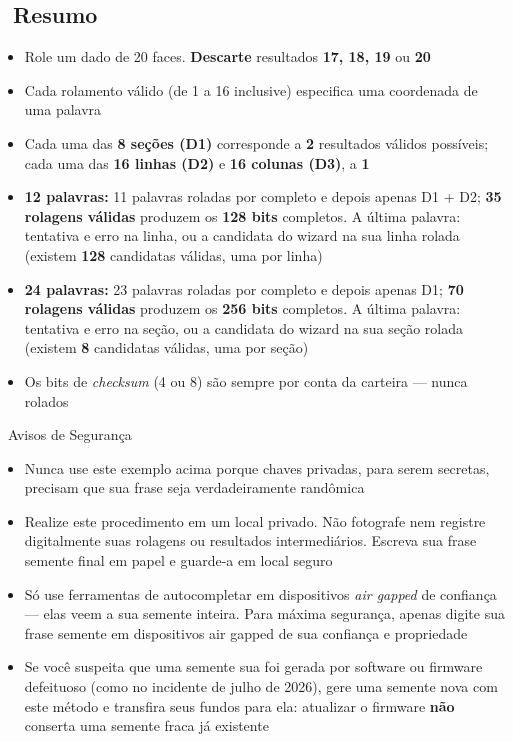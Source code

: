 \documentclass[10pt]{article}
\begin{document}
\subsection*{\faListOl~Resumo}

\begin{itemize}[itemsep=1pt]
 \item Role um dado de 20 faces. \textbf{Descarte} resultados \textbf{17, 18, 19} ou \textbf{20}
 \item Cada rolamento válido (de 1 a 16 inclusive) especifica uma coordenada de uma palavra
 \item Cada uma das \textbf{8 seções (D1)} corresponde a \textbf{2} resultados válidos possíveis; cada uma das \textbf{16 linhas (D2)} e \textbf{16 colunas (D3)}, a \textbf{1}
 \item \textbf{12 palavras:} 11 palavras roladas por completo e depois apenas D1 + D2; \textbf{35 rolagens válidas} produzem os \textbf{128 bits} completos. A última palavra: tentativa e erro na linha, ou a candidata do wizard na sua linha rolada (existem \textbf{128} candidatas válidas, uma por linha)
 \item \textbf{24 palavras:} 23 palavras roladas por completo e depois apenas D1; \textbf{70 rolagens válidas} produzem os \textbf{256 bits} completos. A última palavra: tentativa e erro na seção, ou a candidata do wizard na sua seção rolada (existem \textbf{8} candidatas válidas, uma por seção)
 \item Os bits de \textit{checksum} (4 ou 8) são sempre por conta da carteira --- nunca rolados
\end{itemize}

\begin{warnbox}{\faExclamationTriangle~Avisos de Segurança}
\begin{itemize}[itemsep=1pt]
 \item Nunca use este exemplo acima porque chaves privadas, para serem secretas, precisam que sua frase seja verdadeiramente randômica
 \item Realize este procedimento em um local privado. Não fotografe nem registre digitalmente suas rolagens ou resultados intermediários. Escreva sua frase semente final em papel e guarde-a em local seguro
 \item Só use ferramentas de autocompletar em dispositivos \textit{air gapped} de confiança --- elas veem a sua semente inteira. Para máxima segurança, apenas digite sua frase semente em dispositivos air gapped de sua confiança e propriedade
 \item Se você suspeita que uma semente sua foi gerada por software ou firmware defeituoso (como no incidente de julho de 2026), gere uma semente nova com este método e transfira seus fundos para ela: atualizar o firmware \textbf{não} conserta uma semente fraca já existente
\end{itemize}
\end{warnbox}
\end{document}
